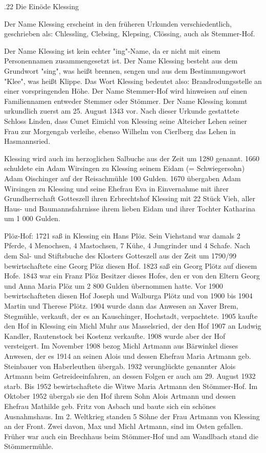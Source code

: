 .22 Die Einöde Klessing

Der Name Klessing erscheint in den früheren Urkunden verschiedentlich,
geschrieben als: Chlessling, Clebsing, Klepsing, Clössing, auch als Stemmer-Hof.

Der Name Klessing ist kein echter "ing"-Name, da er nicht mit einem
Personennamen zusammengesetzt ist. Der Name Klessing besteht aus dem Grundwort
"sing", was heißt brennen, sengen und aus dem Bestimmungswort "Klee", was heißt
Klippe. Das Wort Klessing bedeutet also: Brandrodungsstelle an einer
vorspringenden Höhe. Der Name Stemmer-Hof wird hinweisen auf einen Familiennamen
entweder Stemmer oder Stömmer. Der Name Klessing kommt urkundlich zuerst am 25.
August 1343 vor. Nach dieser Urkunde gestattete Schloss Linden, dass Cunet
Eimichl von Klessing seine Alteicher Lehen seiner Frau zur Morgengab verleihe,
ebenso Wilhelm von Cierlberg das Lehen in Hasmannsried.

Klessing wird auch im herzoglichen Salbuche aus der Zeit um 1280 genannt. 1660
schuldete ein Adam Wirsingen zu Klessing seinem Eidam (= Schwiegersohn) Adam
Oischinger auf der Reisachmühle 100 Gulden. 1670 übergaben Adam Wirsingen zu
Klessing und seine Ehefrau Eva in Einvernahme mit ihrer Grundherrschaft
Gotteszell ihren Erbrechtshof Klessing mit 22 Stück Vieh, aller Haus- und
Baumannsfahrnisse ihrem lieben Eidam und ihrer Tochter Katharina um 1 000
Gulden.

Plöz-Hof: 1721 saß in Klessing ein Hans Plöz. Sein Viehstand war damals 2
Pferde, 4 Menochsen, 4 Mastochsen, 7 Kühe, 4 Jungrinder und 4 Schafe. Nach dem
Sal- und Stiftsbuche des Klosters Gotteszell aus der Zeit um 1790/99
bewirtschaftete eine Georg Plöz diesen Hof. 1823 saß ein Georg Plötz auf diesem
Hofe. 1843 war ein Franz Plöz Besitzer dieses Hofes, den er von den Eltern Georg
und Anna Maria Plöz um 2 800 Gulden übernommen hatte. Vor 1900 bewirtschafteten
diesen Hof Joseph und Walburga Plötz und von 1900 bis 1904 Martin und Therese
Plötz. 1904 wurde dann das Anwesen an Xaver Brem, Stegmühle, verkauft, der es an
Kauschinger, Hochstadt, verpachtete. 1905 kaufte den Hof in Klessing ein Michl
Muhr aus Masselsried, der den Hof 1907 an Ludwig Kandler, Rautenstock bei
Kostenz verkaufte. 1908 wurde aber der Hof versteigert. Im November 1908 bezog
Michl Artmann aus Bärwinkel dieses Anwesen, der es 1914 an seinen Alois und
dessen Ehefrau Maria Artmann geb. Steinbauer von Haberleuthen übergab. 1932
verunglückte genannter Alois Artmann beim Getreideeinfahren, an dessen Folgen er
auch am 29. August 1932 starb. Bis 1952 bewirtschaftete die Witwe Maria Artmann
den Stömmer-Hof. Im Oktober 1952 übergab sie den Hof ihrem Sohn Alois Artmann
und dessen Ehefrau Mathilde geb. Fritz von Asbach und baute sich ein schönes
Ausnahmshaus. Im 2. Weltkrieg standen 5 Söhne der Frau Artmann von Klessing an
der Front. Zwei davon, Max und Michl Artmann, sind im Osten gefallen. Früher war
auch ein Brechhaus beim Stömmer-Hof und am Wandlbach stand die Stömmermühle.

